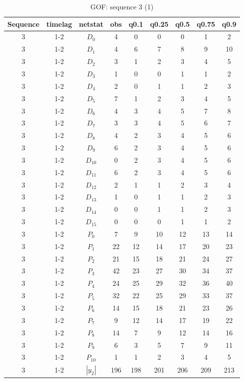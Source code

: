 \documentclass[aspectratio=169,ignorenonframetext,9pt]{beamer}
\theoremstyle{plain}
\theoremstyle{definition}
\begin{document}
\begin{table}[h!]
    \centering
        \begin{tabular}{c| c | c | c | c |c |c |c |c }
            Sequence& timelag & netstat & obs & q0.1 & q0.25 & q0.5 & q0.75 & q0.9 \\
            \hline \hline
            3 & 1-2 & $D_0$ & 4 &  0& 0& 0& 1& 2 \\
            3 & 1-2 & $D_1$ & 4 &  6& 7& 8& 9& 10 \\
            3 & 1-2 & $D_2$ & 3 &  1& 2& 3& 4& 5 \\
            3 & 1-2 & $D_3$ & 1 &  0& 0& 1& 1& 2 \\
            3 & 1-2 & $D_4$ & 2 &  0& 1& 1& 2& 3 \\
            3 & 1-2 & $D_5$ & 7 &  1& 2& 3& 4& 5 \\
            3 & 1-2 & $D_6$ & 4 &  3& 4& 5& 7& 8 \\
            3 & 1-2 & $D_7$ & 3 &  3& 4& 5& 6& 7 \\
            3 & 1-2 & $D_8$ & 4 &  2& 3& 4& 5& 6 \\
            3 & 1-2 & $D_9$ & 6 &  2& 3& 4& 5& 6 \\
            3 & 1-2 & $D_{10}$ & 0 &  2& 3& 4& 5& 6 \\
            3 & 1-2 & $D_{11}$ & 6 &  2& 3& 4& 5& 6 \\
            3 & 1-2 & $D_{12}$ & 2 &  1& 1& 2& 3& 4 \\
            3 & 1-2 & $D_{13}$ & 1 &  0& 1& 1& 2& 3 \\
            3 & 1-2 & $D_{14}$ & 0 &  0& 1& 1& 2& 3 \\
            3 & 1-2 & $D_{15}$ & 0 &  0& 0& 1& 1& 2 \\
            3 & 1-2 & $P_0$ & 7 & 9& 10& 12& 13& 14 \\
            3 & 1-2 & $P_1$ & 22 & 12& 14& 17& 20& 23 \\
            3 & 1-2 & $P_2$ & 21 & 15& 18& 21& 24& 27 \\
            3 & 1-2 & $P_3$ & 42 & 23& 27& 30& 34& 37 \\
            3 & 1-2 & $P_4$ & 24 & 25& 29& 32& 36& 40 \\
            3 & 1-2 & $P_5$ & 32 & 22& 25& 29& 33& 37 \\
            3 & 1-2 & $P_6$ & 14 & 15& 18& 21& 23& 26 \\
            3 & 1-2 & $P_7$ & 9 & 12& 14& 17& 19& 22 \\
            3 & 1-2 & $P_8$ & 14 & 7& 9& 12& 14& 16 \\
            3 & 1-2 & $P_9$ & 6 &  3& 5& 7& 9& 11 \\
            3 & 1-2 & $P_10$ & 1 &  1& 2& 3& 4& 5 \\
            3 & 1-2 & $|y_2|$ & 196 &  198& 201& 206& 209& 213 \\
        \end{tabular}
        \caption{GOF: sequence 3 (1)}
    \end{table}
\end{document}
